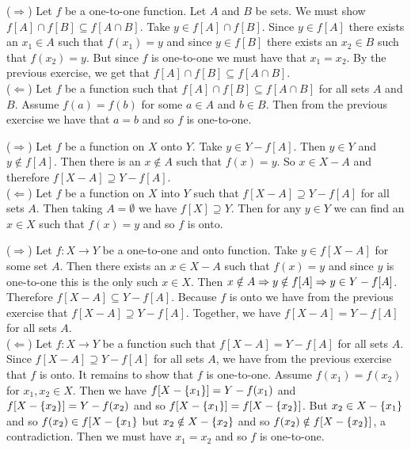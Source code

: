 \documentclass[12pt]{book}
\begin{document}
\begin{enumerate}
{($\Rightarrow$) Let $f$ be a one-to-one function. Let $A$ and $B$ be sets. We must show $f[A]\cap f[B]\subseteq f[A\cap B]$. Take $y\in f[A]\cap f[B]$. Since $y\in f[A]$ there exists an $x_1\in A$ such that $f(x_1)=y$ and since $y\in f[B]$ there exists an $x_2\in B$ such that $f(x_2)=y$. But since $f$ is one-to-one we must have that $x_1=x_2$. By the previous exercise, we get that $f[A]\cap f[B]\subseteq f[A\cap B]$.\\($\Leftarrow$) Let $f$ be a function such that $f[A]\cap f[B]\subseteq f[A\cap B]$ for all sets $A$ and $B$. Assume $f(a)=f(b)$ for some $a\in A$ and $b\in B$. Then from the previous exercise we have that $a=b$ and so $f$ is one-to-one.}

{($\Rightarrow$) Let $f$ be a function on $X$ onto $Y$. Take $y\in Y-f[A]$. Then $y\in Y$ and $y\notin f[A]$. Then there is an $x\notin A$ such that $f(x)=y$. So $x\in X-A$ and therefore $f[X-A]\supseteq Y-f[A]$.\\($\Leftarrow$) Let $f$ be a function on $X$ into $Y$ such that $f[X-A]\supseteq Y-f[A]$ for all sets $A$. Then taking $A=\emptyset$ we have $f[X]\supseteq Y$. Then for any $y\in Y$ we can find an $x\in X$ such that $f(x)=y$ and so $f$ is onto.}

{($\Rightarrow$) Let $f:X\rightarrow Y$ be a one-to-one and onto function. Take $y\in f[X-A]$ for some set $A$. Then there exists an $x\in X-A$ such that $f(x)=y$ and since $y$ is one-to-one this is the only such $x\in X$. Then $x\notin A \Rightarrow y\notin f[A] \Rightarrow y\in Y-f[A]$. Therefore $f[X-A]\subseteq Y-f[A]$. Because $f$ is onto we have from the previous exercise that $f[X-A]\supseteq Y-f[A]$. Together, we have $f[X-A]=Y-f[A]$ for all sets $A$.\\($\Leftarrow$) Let $f:X\rightarrow Y$ be a function such that $f[X-A]=Y-f[A]$ for all sets $A$. Since $f[X-A]\supseteq Y-f[A]$ for all sets $A$, we have from the previous exercise that $f$ is onto. It remains to show that $f$ is one-to-one. Assume $f(x_1)=f(x_2)$ for $x_1,x_2\in X$. Then we have $f[X-\{x_1\}]=Y-f(x_1)$ and $f[X-\{x_2\}]=Y-f(x_2)$ and so $f[X-\{x_1\}]=f[X-\{x_2\}]$. But $x_2\in X-\{x_1\}$ and so $f(x_2)\in f[X-\{x_1\}$ but $x_2\notin X-\{x_2\}$ and so $f(x_2)\notin f[X-\{x_2\}]$, a contradiction. Then we must have $x_1=x_2$ and so $f$ is one-to-one.}

\end{enumerate}
\end{document}
